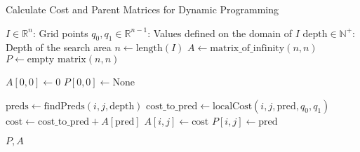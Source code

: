 \begin{algorithm}
    \caption{Calculate Cost and Parent Matrices for Dynamic Programming}
    \begin{algorithmic}[1]
    \Require $I \in \mathbb{R}^n$: Grid points
    \Require $q_0, q_1 \in \mathbb{R}^{n-1}$: Values defined on the domain of $I$
    \Require $\text{depth} \in \mathbb{N}^+$: Depth of the search area
        \State $n \gets \text{length}(I)$
        \State $A \gets \text{matrix\_of\_infinity}(n, n)$ 
        \State $P \gets \text{empty matrix}(n, n)$ 
        
        \State $A[0, 0] \gets 0$ 
        \State $P[0, 0] \gets \text{None}$ 
        
                \State $\text{preds} \gets \text{findPreds}(i, j, \text{depth})$ \Comment{\eqref{eq:search-area}}
                    \State $\text{cost\_to\_pred} \gets \text{localCost}(i, j, \text{pred}, q_0, q_1)$ 
                    \Comment{\eqref{eq:local-cost-functional}, \eqref{eq:local-cost-functional-SE3}}
                    \State $\text{cost} \gets \text{cost\_to\_pred} + A[\text{pred}]$ \Comment{\eqref{eq:cost-matrix}}
                        \State $A[i, j] \gets \text{cost}$
                        \State $P[i, j] \gets \text{pred}$
                    \EndIf
                \EndFor
            \EndFor
        \EndFor
    
        \State \Return $P, A$
    \EndFunction
    \end{algorithmic}
\end{algorithm}
    